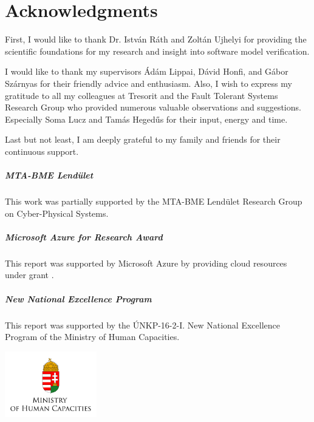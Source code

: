 \chapter*{Acknowledgments}
\label{chap:acknowledgments}
\thispagestyle{plain}

First, I would like to thank Dr. István Ráth and Zoltán Ujhelyi for providing the scientific foundations for my research and insight into software model verification.

I would like to thank my supervisors Ádám Lippai, Dávid Honfi, and Gábor Szárnyas for their friendly advice and enthusiasm. Also, I wish to express my gratitude to all my colleagues at Tresorit and the Fault Tolerant Systems Research Group who provided numerous valuable observations and suggestions. Especially Soma Lucz and Tamás Hegedűs for their input, energy and time.

Last but not least, I am deeply grateful to my family and friends for their continuous support.


\vfill

\paragraph{MTA-BME Lend\"ulet}
This work was partially supported by the MTA-BME Lend\"ulet Research Group on Cyber-Physical Systems.

\paragraph{Microsoft Azure for Research Award}
This report was supported by Microsoft Azure by providing cloud resources under grant .

\paragraph{New National Excellence Program}
This report was supported by the ÚNKP-16-2-I. New National Excellence Program of the Ministry of Human Capacities.

\begin{center}
\includegraphics[width=0.3\textwidth]{include/figures/min_en.jpg}
\end{center}
